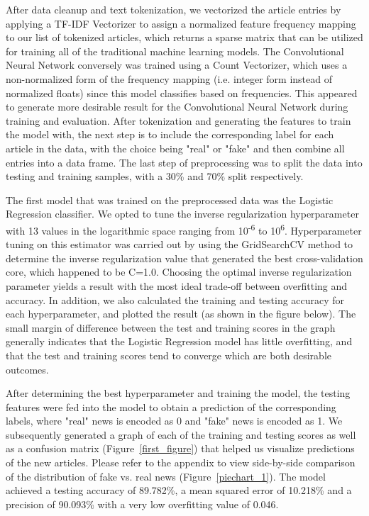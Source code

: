 \documentclass[10pt,twocolumn,letterpaper]{article}
\begin{document}
After data cleanup and text tokenization, we vectorized the article entries by applying a TF-IDF Vectorizer to assign a normalized feature frequency mapping to our list of tokenized articles, which returns a sparse matrix that can be utilized for training all of the traditional machine learning models. The Convolutional Neural Network conversely was trained using a Count Vectorizer, which uses a non-normalized form of the frequency mapping (i.e. integer form instead of normalized floats) since this model classifies based on frequencies. This appeared to generate more desirable result for the Convolutional Neural Network during training and evaluation. After tokenization and generating the features to train the model with, the next step is to include the corresponding label for each article in the data, with the choice being "real" or "fake" and then combine all entries into a data frame. The last step of preprocessing was to split the data into testing and training samples, with a 30\% and 70\% split respectively.\par

The first model that was trained on the preprocessed data was the Logistic Regression classifier. We opted to tune the inverse regularization hyperparameter with 13 values in the logarithmic space ranging from 10\textsuperscript{-6} to 10\textsuperscript{6}. Hyperparameter tuning on this estimator was carried out by using the GridSearchCV method to determine the inverse regularization value that generated the best cross-validation core, which happened to be C=1.0. Choosing the optimal inverse regularization parameter yields a result with the most ideal trade-off between overfitting and accuracy.  In addition, we also calculated the training and testing accuracy for each hyperparameter, and plotted the result (as shown in the figure below). The small margin of difference between the test and training scores in the graph generally indicates that the Logistic Regression model has little overfitting, and that the test and training scores tend to converge which are both desirable outcomes.\par

After determining the best hyperparameter and training the model, the testing features were fed into the model to obtain a prediction of the corresponding labels, where "real" news is encoded as 0 and "fake" news is encoded as 1. We subsequently generated a graph of each of the training and testing scores as well as a confusion matrix (Figure~\ref{first_figure}) that helped us visualize predictions of the new articles. Please refer to the appendix to view side-by-side comparison of the distribution of fake vs. real news (Figure~\ref{piechart_1}). The model achieved a testing accuracy of 89.782\%, a mean squared error of 10.218\% and a precision of 90.093\% with a very low overfitting value of 0.046. \\
\end{document}
